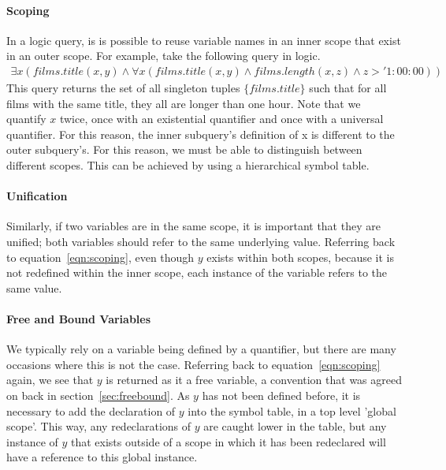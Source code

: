 \documentclass[a4paper, 11pt]{article}
\begin{document}
      \paragraph{Scoping}
        In a logic query, is is possible to reuse variable names in an inner
        scope that exist in an outer scope. For example, take the following
        query in logic.
        \begin{multline}
        \exists x(films.title(x, y) \land \forall x(films.title(x, y) \land
        films.length(x, z) \land z > '1:00:00)) \label{eqn:scoping}
        \end{multline}
        This query returns the set of all singleton tuples $\{films.title\}$ such
        that for all films with the same title, they all are longer than one
        hour. Note that we quantify $x$ twice, once with an existential
        quantifier and once with a universal quantifier. For this reason, the
        inner subquery's definition of x is different to the outer subquery's.
        For this reason, we must be able to distinguish between different
        scopes. This can be achieved by using a hierarchical symbol table.

      \paragraph{Unification}
        Similarly, if two variables are in the same scope, it is important that
        they are unified; both variables should refer to the same underlying
        value. Referring back to equation~\ref{eqn:scoping}, even
        though $y$ exists within both scopes, because it is not redefined
        within the inner scope, each instance of the variable refers to the 
        same value.

      \paragraph{Free and Bound Variables}
        We typically rely on a variable being defined by a quantifier, but
        there are many occasions where this is not the case. Referring back to
        equation~\ref{eqn:scoping} again, we see that $y$ is returned as it a
        free variable, a convention that was agreed on back in
        section~\ref{sec:freebound}. As $y$ has not been defined before, it is
        necessary to add the declaration of $y$ into the symbol table, in a top
        level 'global scope'. This way, any redeclarations of $y$ are caught
        lower in the table, but any instance of $y$ that exists outside of a
        scope in which it has been redeclared will have a reference to this
        global instance.
\end{document}
